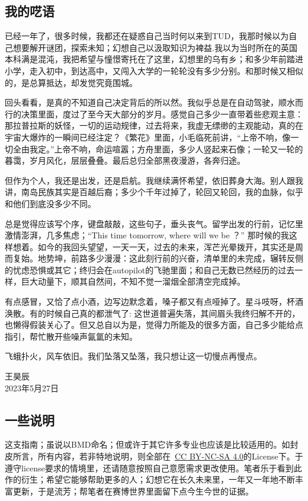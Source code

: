 \subsection{我的呓语}
已经一年了，很多时候，我都还在疑惑自己当时何以来到TUD，我那时候以为自己想要解开谜团，探索未知；幻想自己以汲取知识为裨益.我以为当时所在的英国本科满是混沌，我把希望与憧憬寄托在了这里，幻想里的乌有乡；和多少年前踏进小学，走入初中，到达高中，又闯入大学的一轮轮没有多少分别。和那时候又相似的，是总算抵达，却发觉究竟围城。

回头看看，是真的不知道自己决定背后的所以然。我似乎总是在自动驾驶，顺水而行的决策里面，度过了至今天大部分的岁月。感觉自己多少一直带着些悲观主意：那拉普拉斯的妖怪，一切的运动规律，过去将来，我虚无缥缈的主观能动，真的在宇宙大爆炸的一瞬间已经注定？《繁花》里面，小毛临死前讲，“上帝不响，像一切全由我定。”上帝不响，命运喧嚣；方舟里面，多少人竖起来石像；一轮又一轮的暮霭，岁月风化，层层叠叠。最后总归全部黑夜漫游，各奔归途。

但作为个人，我还是出发，还是启航。我继续满怀希望，依旧葬身大海。别人跟我讲，南岛民族其实是百越后裔；多少个千年过掉了，轮回又轮回，我的血脉，似乎和他们到底没多少不同。

总是觉得应该写个序，键盘敲敲，这些句子，垂头丧气。留学出发的行前，记忆里激情澎湃，几多焦虑；“This time tomorrow, where will we be ？” 那时候的我这样想着。如今的我回头望望，一天一天，过去的未来，浑芒光晕拨开，其实还是周而复始。地势坤，前路多少漫漫：这此刻行前的兴奋，清单里的未完成，辗转反侧的忧虑恐惧或其它；终归会在autopilot的飞驰里面；和自己无数已然经历的过去一样，巨大动量下，顺其自然间，不知不觉一溜烟全部清空完成掉。

有点感冒，又恰了点小酒，边写边默念着，嗓子都又有点哑掉了。星斗吱呀，杯酒涣散。有的时候自己真的都泄气了: 这世道普遍失落，其间眉头我终归解不开的，也懒得假装关心了。但又总自以为是，觉得力所能及的很多方面，自己多少能给点指引，帮忙散开些噪声氤氲的未知。

飞蛾扑火，风车依旧。我们坠落又坠落，我只想让这一切慢点再慢点。

\vspace*{\fill}
\begin{flushright}
王昊辰\\
2023年5月27日
\end{flushright}

\newpage\subsection{一些说明}
这支指南；虽说以BMD命名；但或许于其它许多专业也应该是比较适用的。如封皮所言，所有内容，若非特地说明，则全部在\ccbyncsa\ \href{http://creativecommons.org/licenses/by-nc-sa/4.0/}{\uline{CC BY-NC-SA 4.0}}的License下。于遵守license要求的情境里，还请随意按照自己意愿需求更改使用。笔者乐于看到此作的衍生；希望它能够帮助更多的人；幻想它在长久未来里，一年又一年地不断丰富更新，于是流芳；帮笔者在赛博世界里面留下点今生今世的证据。

